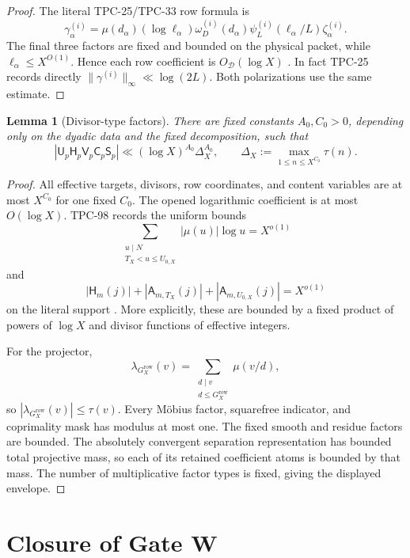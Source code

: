 \documentclass[11pt]{article}
\newtheorem{lemma}[theorem]{Lemma}
\theoremstyle{definition}
\theoremstyle{remark}
\begin{document}
\begin{proof}
The literal TPC-25/TPC-33 row formula is
\[
 \gamma_\alpha^{(i)}
 =
 \mu(d_\alpha)(\log\ell_\alpha)
 \omega_D^{(i)}(d_\alpha)
 \psi_L^{(i)}(\ell_\alpha/L)\zeta_\alpha^{(i)}.
\]
The final three factors are fixed and bounded on the physical
packet, while \(\ell_\alpha\le X^{O(1)}\).  Hence each row
coefficient is \(O_{\mathscr D}(\log X)\)
\citep{WangTPC25,WangTPC33}.  In fact TPC-25 records directly
\(\|\gamma^{(i)}\|_\infty\ll\log(2L)\).  Both polarizations use
the same estimate.
\end{proof}

\begin{lemma}[Divisor-type factors]
\label{lem:divisor}
There are fixed constants \(A_0,C_0>0\), depending only on the
dyadic data and the fixed decomposition, such that
\[
 |\mathsf U_p\mathsf H_p\mathsf V_p
   \mathsf C_p\mathsf S_p|
 \ll
 (\log X)^{A_0}
 \Delta_X^{A_0},
 \qquad
 \Delta_X:=\max_{1\le n\le X^{C_0}}\tau(n).
\]
\end{lemma}

\begin{proof}
All effective targets, divisors, row coordinates, and content
variables are at most \(X^{C_0}\) for one fixed \(C_0\).
The opened logarithmic coefficient is at most \(O(\log X)\).
TPC-98 records the uniform bounds
\[
 \sum_{\substack{u\mid N\\T_X<u\le U_{0,X}}}
 |\mu(u)|\log u=X^{o(1)}
\]
and
\[
 |\mathsf H_m(j)|+
 |\mathsf A_{m,T_X}(j)|+
 |\mathsf A_{m,U_{0,X}}(j)|=X^{o(1)}
\]
on the literal support \citep{WangTPC98}.  More explicitly, these
are bounded by a fixed product of powers of \(\log X\) and divisor
functions of effective integers.

For the projector,
\[
 \lambda_{G_X^{\mathrm{row}}}(v)
 =
 \sum_{\substack{d\mid v\\d\le G_X^{\mathrm{row}}}}\mu(v/d),
\]
so \(|\lambda_{G_X^{\mathrm{row}}}(v)|\le\tau(v)\).
Every M\"obius factor, squarefree indicator, and coprimality mask
has modulus at most one.  The fixed smooth and residue factors are
bounded.  The absolutely convergent separation representation has
bounded total projective mass, so each of its retained coefficient
atoms is bounded by that mass.  The number of multiplicative
factor types is fixed, giving the displayed envelope.
\end{proof}

\section{Closure of Gate W}
\label{sec:cap}
\end{document}
